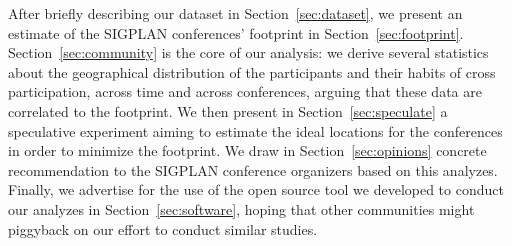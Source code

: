 After briefly describing our dataset in Section~\ref{sec:dataset}, we
present an estimate of the SIGPLAN conferences' footprint in
Section~\ref{sec:footprint}.  Section~\ref{sec:community} is the core of our
analysis: we derive several statistics about the geographical distribution
of the participants and their habits of cross participation, across time and
across conferences, arguing that these data are correlated to the footprint.
We then present in Section~\ref{sec:speculate} a speculative experiment
aiming to estimate the ideal locations for the conferences in order to
minimize the footprint.  \ifopinions We draw in Section~\ref{sec:opinions}
concrete recommendation to the SIGPLAN conference organizers based on this
analyzes.  \fi Finally, we advertise for the use of the open source tool we
developed to conduct our analyzes in Section~\ref{sec:software}, hoping that
other communities might piggyback on our effort to conduct similar studies.

